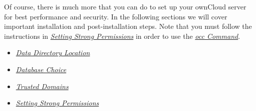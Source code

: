 \documentclass[letterpaper,10pt,english]{sphinxmanual}
\begin{document}
Of course, there is much more that you can do to set up your ownCloud server for
best performance and security. In the following sections we will cover important
installation and post-installation steps. Note that you must follow the
instructions in {\hyperref[installation/installation_wizard:strong-perms-label]{\emph{Setting Strong Permissions}}} in order
to use the {\hyperref[configuration_server/occ_command::doc]{\emph{occ Command}}}.
\begin{itemize}
\item {} 
{\hyperref[installation/installation_wizard:data-directory-location-label]{\emph{Data Directory Location}}}

\item {} 
{\hyperref[installation/installation_wizard:database-choice-label]{\emph{Database Choice}}}

\item {} 
{\hyperref[installation/installation_wizard:trusted-domains-label]{\emph{Trusted Domains}}}

\item {} 
{\hyperref[installation/installation_wizard:strong-perms-label]{\emph{Setting Strong Permissions}}}

\end{itemize}
\end{document}
